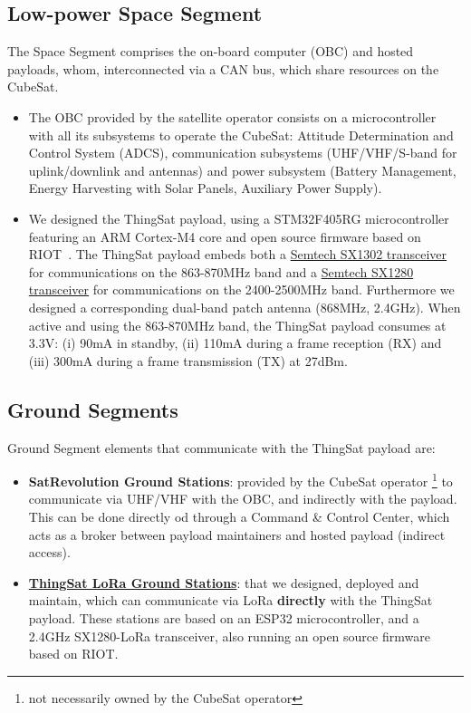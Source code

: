 \subsection*{Low-power Space Segment}
The Space Segment comprises the on-board computer (OBC) and hosted payloads, whom,
interconnected via a CAN bus, which share resources on the CubeSat.
\begin{itemize}
\item The OBC provided by the satellite operator consists on
a microcontroller with all its subsystems to operate the CubeSat:
Attitude Determination and Control System (ADCS),
communication subsystems (UHF/VHF/S-band for uplink/downlink and antennas) and
power subsystem (Battery Management, Energy Harvesting with Solar Panels, Auxiliary Power Supply).

\item We designed the ThingSat payload, using a STM32F405RG %
microcontroller featuring an ARM Cortex-M4 core
and open source firmware based on RIOT~\cite{baccelli2018riot}. The ThingSat payload embeds both a
\href{https://www.semtech.com/products/wireless-rf/lora-gateways/sx1302}{Semtech SX1302 transceiver} for
communications on the 863-870MHz band and a \href{https://www.semtech.com/products/wireless-rf/24-ghz-transceivers/sx1280}{Semtech SX1280 transceiver}
for communications on the 2400-2500MHz band. Furthermore we designed a corresponding dual-band patch antenna (868MHz, 2.4GHz).
When active and using the 863-870MHz band, the ThingSat payload consumes at 3.3V:
(i) 90mA in standby,
(ii) 110mA during a frame reception (RX) and
(iii) 300mA during a frame transmission (TX) at 27dBm.
\end{itemize}

\subsection*{Ground Segments}
Ground Segment elements that communicate with the ThingSat payload are:
\begin{itemize}
\item \textbf{SatRevolution Ground Stations}: provided by the CubeSat operator \footnote{not
necessarily owned by the CubeSat operator} to communicate via UHF/VHF with the OBC,
and indirectly with the payload. This can be done directly od through a Command \&
Control Center, which acts as a broker between payload maintainers and hosted payload
(indirect access).
\item \href{https://github.com/thingsat/tinygs_2g4station}{\textbf{ThingSat LoRa Ground Stations}}:
that we designed, deployed and maintain, which can communicate via LoRa \textbf{directly} with the
ThingSat payload. These stations are based on an ESP32 microcontroller, and a 2.4GHz SX1280-LoRa
transceiver, also running an open source firmware based on RIOT.
\end{itemize}

